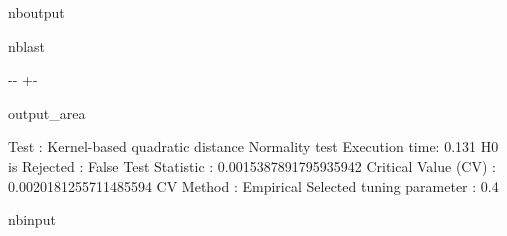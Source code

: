 \documentclass[letterpaper,10pt,english,openany,oneside]{sphinxmanual}
\begin{document}
\begin{sphinxuseclass}{nboutput}
\begin{sphinxuseclass}{nblast}
{

\kern-\sphinxverbatimsmallskipamount\kern-\baselineskip
\kern+\FrameHeightAdjust\kern-\fboxrule
\vspace{\nbsphinxcodecellspacing}

\begin{sphinxuseclass}{output_area}
\begin{sphinxuseclass}{}


\begin{sphinxVerbatim}[commandchars=\\\{\}]
Test : Kernel-based quadratic distance Normality test
Execution time: 0.131
H0 is Rejected : False
Test Statistic : 0.0015387891795935942
Critical Value (CV) : 0.0020181255711485594
CV Method : Empirical
Selected tuning parameter : 0.4
\end{sphinxVerbatim}



\end{sphinxuseclass}
\end{sphinxuseclass}
}

\end{sphinxuseclass}
\end{sphinxuseclass}
\begin{sphinxuseclass}{nbinput}
{
\begin{sphinxVerbatim}[commandchars=\\\{\}]
\llap{\color{nbsphinxin}[4]:\,\hspace{\fboxrule}\hspace{\fboxsep}}
\end{sphinxVerbatim}
}

\end{sphinxuseclass}
\end{document}
